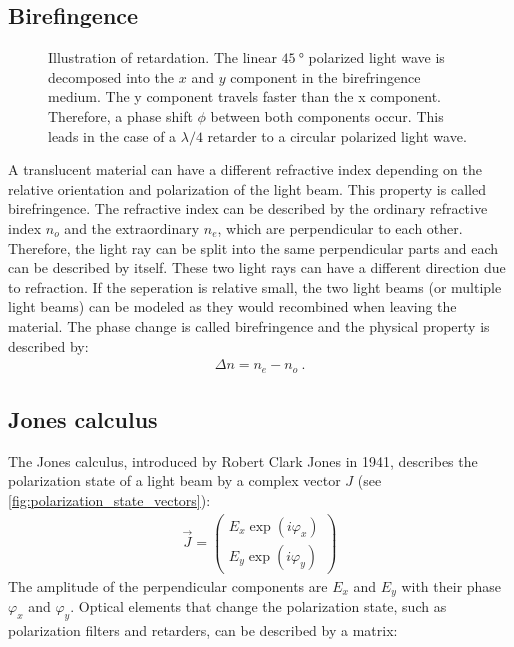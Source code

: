 \subsection{Birefingence}
%
\begin{figure}[!t]
\centering
\setlength{\tikzwidth}{\textwidth}
\caption{Illustration of retardation. The linear $\SI{45}{\degree}$ polarized light wave is decomposed into the $x$ and $y$ component in the birefringence medium. The y component travels faster than the x component. Therefore, a phase shift $\phi$ between both components occur. This leads in the case of a $\lambda/4$ retarder to a circular polarized light wave.}
\label{fig:optic_retardation}
\end{figure}
%
A translucent material can have a different refractive index depending on the relative orientation and polarization of the light beam.
This property is called birefringence.
The refractive index can be described by the ordinary refractive index $n_o$ and the extraordinary $n_e$, which are perpendicular to each other.
Therefore, the light ray can be split into the same perpendicular parts and each can be described by itself.
These two light rays can have a different direction due to refraction.
If the seperation is relative small, the two light beams (or multiple light beams) can be modeled as they would recombined when leaving the material.
The phase change is called birefringence and the physical property is described by:
%
\begin{align}
    \Delta n = n_e - n_o \> .
\end{align}
%
%
%
\subsection{Jones calculus}
\label{sec:jones}
% 
The Jones calculus, introduced by Robert Clark Jones in 1941, describes the polarization state of a light beam by a complex vector $J$ (see \cref{fig:polarization_state_vectors}):
%
\begin{align}
    \vec{J} = \begin{pmatrix} E_x \exp(i \varphi_x) \\ E_y \exp(i \varphi_y) \end{pmatrix}
\end{align}
%
The amplitude of the perpendicular components are $E_x$ and $E_y$ with their phase $\varphi_x$ and $\varphi_y$.
Optical elements that change the polarization state, such as polarization filters and retarders, can be described by a matrix:
%
